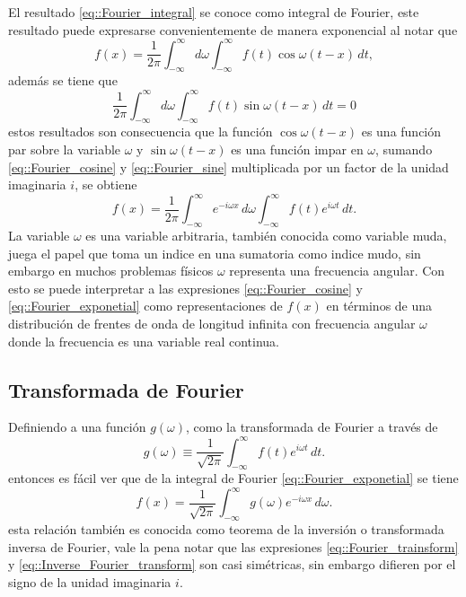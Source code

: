 \documentclass[a4paper]{article}
\begin{document}
El resultado \ref{eq::Fourier_integral} se conoce como integral de Fourier, este resultado puede expresarse convenientemente de manera exponencial al notar que 
\begin{equation}\label{eq::Fourier_cosine}
f(x)=\frac{1}{2\pi}\int_{-\infty}^{\infty}d\omega \int_{-\infty}^\infty f(t) \cos\omega(t-x)\, dt,
\end{equation}
además se tiene que 
\begin{equation}\label{eq::Fourier_sine}
\frac{1}{2\pi}\int_{-\infty}^\infty d\omega \int_{-\infty}^\infty f(t) \sin\omega(t-x)\, dt=0
\end{equation}
estos resultados son consecuencia que la función $\cos \omega (t-x)$ es una función par sobre la variable $\omega$ y $\sin\omega(t-x)$ es una función impar en $\omega$, sumando \ref{eq::Fourier_cosine} y \ref{eq::Fourier_sine} multiplicada por un factor de la unidad imaginaria $i$, se obtiene
\begin{equation}\label{eq::Fourier_exponetial}
f(x)=\frac{1}{2\pi}\int_{-\infty}^\infty e^{-i \omega x }\,d\omega \int_{-\infty}^\infty f(t)e^{i\omega t}\,dt.
\end{equation}
La variable $\omega$ es una variable arbitraria, también conocida como variable muda, juega el papel que toma un indice en una sumatoria como indice mudo, sin embargo en muchos problemas físicos $\omega$ representa una frecuencia angular. Con esto se puede interpretar a las expresiones \ref{eq::Fourier_cosine} y \ref{eq::Fourier_exponetial} como representaciones de $f(x)$ en términos de una distribución de frentes de onda de longitud infinita con frecuencia angular $\omega$ donde la frecuencia es una variable real continua.
\subsection{Transformada de Fourier}
Definiendo a una función $g(\omega)$, como la transformada de Fourier a través de 
\begin{equation}\label{eq::Fourier_trainsform}
g(\omega)\equiv \frac{1}{\sqrt{2\pi}}\int_{-\infty}^\infty f(t) e ^{i\omega t }\, dt.
\end{equation}
entonces es fácil ver que de la integral de Fourier \ref{eq::Fourier_exponetial} se tiene 
\begin{equation}\label{eq::Inverse_Fourier_transform}
f(x)=\frac{1}{\sqrt{2\pi}}\int_{-\infty}^\infty g(\omega)e^{-i \omega x}\, d\omega.
\end{equation}
esta relación también es conocida como teorema de la inversión o transformada inversa de Fourier, vale la pena notar que las expresiones \ref{eq::Fourier_trainsform} y \ref{eq::Inverse_Fourier_transform} son casi simétricas, sin embargo difieren por el signo de la unidad imaginaria $i$.
\end{document}
